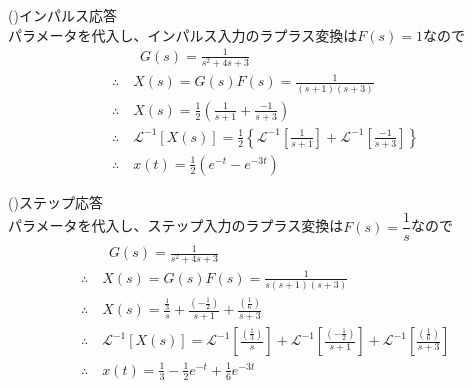 \documentclass[a4paper,12pt]{article}
\begin{document}
\begin{tcolorbox}[title={4. (2)\(m=1,d=4,k_1=1,k_2=2\)とし、インパルス応答、ステップ応答をそれぞれ\\
\indent \quad 求めよ。}]

    (\uppercase\expandafter{})インパルス応答 \\
    パラメータを代入し、インパルス入力のラプラス変換は\(F(s)=1\)なので
    \vspace{-2mm}
    \begin{align*}
        &\qquad G(s) = \frac{1}{s^2 + 4 s + 3 } \\
        &\therefore \quad X(s) = G(s) F(s) = \frac{1}{(s+1)(s+3)} \\
        &\therefore \quad X(s) = \frac{1}{2} \left( \frac{1}{s+1} + \frac{-1}{s+3} \right)\\
        &\therefore \quad \mathcal{L}^{-1} \left[ X(s)\right] 
        =\frac{1}{2} \left\{ \mathcal{L}^{-1} \left[\frac{1}{s+1}\right] 
        + \mathcal{L}^{-1} \left[\frac{-1}{s+3}\right] \right\}\\
        &\therefore \quad x(t) = \frac{1}{2}\left(e^{-t} - e^{-3t} \right)
    \end{align*}

    (\uppercase\expandafter{})ステップ応答 \\
    パラメータを代入し、ステップ入力のラプラス変換は\(F(s)=\dfrac{1}{s}\)なので
    \vspace{-2mm}
    \begin{align*}
        &\qquad G(s) = \frac{1}{s^2 + 4 s + 3 } \\
        &\therefore \quad X(s) = G(s) F(s) = \frac{1}{s(s+1)(s+3)} \\
        &\therefore \quad X(s) = \frac{\frac{1}{3}}{s} 
        + \frac{\left(-\frac{1}{2}\right)}{s+1} 
        + \frac{\left(\frac{1}{6}\right)}{s+3} \\
        &\therefore \quad \mathcal{L}^{-1} \left[ X(s)\right] 
        = \mathcal{L}^{-1} \left[\frac{\left(\frac{1}{3}\right)}{s}\right] 
        + \mathcal{L}^{-1} \left[\frac{\left(-\frac{1}{2}\right)}{s+1}\right]
        + \mathcal{L}^{-1} \left[\frac{\left(\frac{1}{6}\right)}{s+3}\right] \\
        &\therefore \quad x(t) = \frac{1}{3} - \frac{1}{2}e^{-t} +\frac{1}{6} e^{-3t}
    \end{align*}

\end{tcolorbox}
\end{document}
